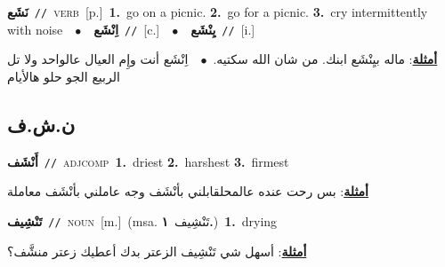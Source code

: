 \documentclass[10pt,a4paper,twoside]{article} %
\begin{document}
\begin{multicols}{2}
{\setlength\topsep{0pt}\textbf{\foreignlanguage{arabic}{نَشَع}}\ {\color{gray}\texttt{//}\color{black}}\ \textsc{verb}\ [p.]\ \textbf{1.}~go on a picnic.  \textbf{2.}~go for a picnic.  \textbf{3.}~cry intermittently with noise\ \ $\bullet$\ \ \setlength\topsep{0pt}\textbf{\foreignlanguage{arabic}{اِنْشَع}}\ {\color{gray}\texttt{//}\color{black}}\ [c.]\ \ $\bullet$\ \ \setlength\topsep{0pt}\textbf{\foreignlanguage{arabic}{يِنْشَع}}\ {\color{gray}\texttt{//}\color{black}}\ [i.]\  \begin{flushright}\color{gray}\foreignlanguage{arabic}{\textbf{\underline{\foreignlanguage{arabic}{أمثلة}}}: ماله بيِنْشَع ابنك. من شان الله سكتيه.\ $\bullet$\ \  اِنْشَع أنت وإِم العيال عالواحد ولا تل الربيع الجو حلو هالأيام}\end{flushright}\color{black}} \vspace{2mm}

\vspace{-3mm}
\subsection*{\color{blue}\foreignlanguage{arabic}{ن.ش.ف}\color{blue}{}} 

{\setlength\topsep{0pt}\textbf{\foreignlanguage{arabic}{أَنْشَف}}\ {\color{gray}\texttt{//}\color{black}}\ \textsc{adj\textunderscore comp}\ \textbf{1.}~driest  \textbf{2.}~harshest  \textbf{3.}~firmest\  \begin{flushright}\color{gray}\foreignlanguage{arabic}{\textbf{\underline{\foreignlanguage{arabic}{أمثلة}}}: بس رحت عنده عالمحلقابلني بأنْشَف وجه عاملني بأنْشَف معاملة}\end{flushright}\color{black}} \vspace{2mm}

{\setlength\topsep{0pt}\textbf{\foreignlanguage{arabic}{تَنْشِيف}}\ {\color{gray}\texttt{//}\color{black}}\ \textsc{noun}\ [m.]\ \color{gray}(msa. \foreignlanguage{arabic}{تَنْشِيف}~\foreignlanguage{arabic}{\textbf{١.}})\color{black}\ \textbf{1.}~drying\  \begin{flushright}\color{gray}\foreignlanguage{arabic}{\textbf{\underline{\foreignlanguage{arabic}{أمثلة}}}: أسهل شي تَنْشِيف الزعتر بدك أعطيك زعتر منشَّف؟}\end{flushright}\color{black}} \vspace{2mm}


\end{multicols}
\end{document}
